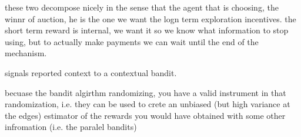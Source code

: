 these two decompose nicely in the sense that the agent that is choosing, the winnr of auction, he is the one we want the logn term exploration incentives. the short term reward is internal, we want it so we know what information to stop using, but to actually make payments we can wait until the end of the mechanism.


signals reported context to a contextual bandit.

becuase the bandit algirthm randomizing, you have a valid instrument in that randomization, i.e. they can be used to crete an unbiased (but high variance at the edges) estimator of the rewards you would have obtained with some other infromation (i.e. the paralel bandits)
